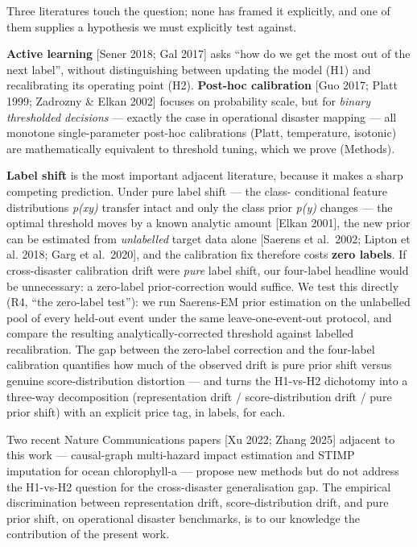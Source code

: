 Three literatures touch the question; none has framed it explicitly,
and one of them supplies a hypothesis we must explicitly test against.

\textbf{Active learning} {[}Sener 2018; Gal 2017{]} asks ``how do we get the most
out of the next label'', without distinguishing between updating the
model (H1) and recalibrating its operating point (H2). \textbf{Post-hoc
calibration} {[}Guo 2017; Platt 1999; Zadrozny \& Elkan 2002{]} focuses on
probability scale, but for \emph{binary thresholded decisions} --- exactly the
case in operational disaster mapping --- all monotone single-parameter
post-hoc calibrations (Platt, temperature, isotonic) are mathematically
equivalent to threshold tuning, which we prove (Methods).

\textbf{Label shift} is the most important adjacent literature, because it
makes a sharp competing prediction. Under pure label shift --- the class-
conditional feature distributions \emph{p(x\textbar y)} transfer intact and only the
class prior \emph{p(y)} changes --- the optimal threshold moves by a known
analytic amount {[}Elkan 2001{]}, the new prior can be estimated from
\emph{unlabelled} target data alone {[}Saerens et al.~2002; Lipton et al.
2018; Garg et al.~2020{]}, and the calibration fix therefore costs
\textbf{zero labels}. If cross-disaster calibration drift were \emph{pure} label
shift, our four-label headline would be unnecessary: a zero-label
prior-correction would suffice. We test this directly (R4, ``the
zero-label test''): we run Saerens-EM prior estimation on the unlabelled
pool of every held-out event under the same leave-one-event-out
protocol, and compare the resulting analytically-corrected threshold
against labelled recalibration. The gap between the zero-label
correction and the four-label calibration quantifies how much of the
observed drift is pure prior shift versus genuine score-distribution
distortion --- and turns the H1-vs-H2 dichotomy into a three-way
decomposition (representation drift / score-distribution drift / pure
prior shift) with an explicit price tag, in labels, for each.

Two recent Nature Communications papers {[}Xu 2022; Zhang 2025{]} adjacent
to this work --- causal-graph multi-hazard impact estimation and STIMP
imputation for ocean chlorophyll-a --- propose new methods but do not
address the H1-vs-H2 question for the cross-disaster generalisation
gap. The empirical discrimination between representation drift,
score-distribution drift, and pure prior shift, on operational
disaster benchmarks, is to our knowledge the contribution of the
present work.

